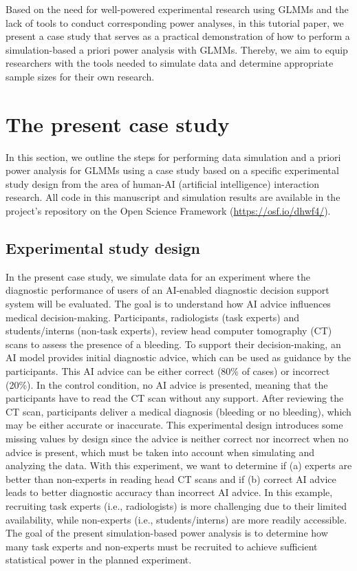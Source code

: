\documentclass[
  man,floatsintext]{apa6}
\begin{document}
Based on the need for well-powered experimental research using GLMMs and the lack of tools to conduct corresponding power analyses, in this tutorial paper, we present a case study that serves as a practical demonstration of how to perform a simulation-based a priori power analysis with GLMMs. Thereby, we aim to equip researchers with the tools needed to simulate data and determine appropriate sample sizes for their own research.

\hypertarget{the-present-case-study}{%
\section{The present case study}\label{the-present-case-study}}

In this section, we outline the steps for performing data simulation and a priori power analysis for GLMMs using a case study based on a specific experimental study design from the area of human-AI (artificial intelligence) interaction research. All code in this manuscript and simulation results are available in the project's repository on the Open Science Framework (\url{https://osf.io/dhwf4/}).

\hypertarget{experimental-study-design}{%
\subsection{Experimental study design}\label{experimental-study-design}}

In the present case study, we simulate data for an experiment where the diagnostic performance of users of an AI-enabled diagnostic decision support system will be evaluated.
The goal is to understand how AI advice influences medical decision-making. Participants, radiologists (task experts) and students/interns (non-task experts), review head computer tomography (CT) scans to assess the presence of a bleeding.
To support their decision-making, an AI model provides initial diagnostic advice, which can be used as guidance by the participants. This AI advice can be either correct (80\% of cases) or incorrect (20\%). In the control condition, no AI advice is presented, meaning that the participants have to read the CT scan without any support. After reviewing the CT scan, participants deliver a medical diagnosis (bleeding or no bleeding), which may be either accurate or inaccurate.
This experimental design introduces some missing values by design since the advice is neither correct nor incorrect when no advice is present, which must be taken into account when simulating and analyzing the data. With this experiment, we want to determine if (a) experts are better than non-experts in reading head CT scans and if (b) correct AI advice leads to better diagnostic accuracy than incorrect AI advice.
In this example, recruiting task experts (i.e., radiologists) is more challenging due to their limited availability, while non-experts (i.e., students/interns) are more readily accessible.
The goal of the present simulation-based power analysis is to determine how many task experts and non-experts must be recruited to achieve sufficient statistical power in the planned experiment.
\end{document}
